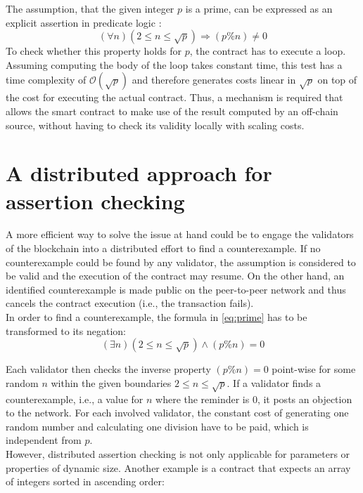 The assumption, that the given integer $p$ is a prime, can be expressed as an explicit assertion in predicate logic \cite{thiemann_2020}: 
\begin{equation}\label{eq:prime}
    (\forall n) (2 \le n \le \sqrt{p}) \Rightarrow (p \% n) \neq 0
\end{equation}
To check whether this property holds for $p$, the contract has to execute a loop. Assuming computing the body of the loop takes constant time, this test has a time complexity of $\mathcal{O}(\sqrt{p})$ and therefore generates costs linear in $\sqrt{p}$ on top of the cost for executing the actual contract. Thus, a mechanism is required that allows the smart contract to make use of the result computed by an off-chain source, without having to check its validity locally with scaling costs.

\section{A distributed approach for assertion checking}
A more efficient way to solve the issue at hand could be to engage the validators of the blockchain into a distributed effort to find a counterexample. If no counterexample could be found by any validator, the assumption is considered to be valid and the execution of the contract may resume. On the other hand, an identified counterexample is made public on the peer-to-peer network and thus cancels the contract execution (i.e., the transaction fails). \\
In order to find a counterexample, the formula in \eqref{eq:prime} has to be transformed to its negation:
\begin{equation}\label{eq:prime_neg}
	(\exists n) (2 \le n \le \sqrt{p}) \wedge (p \% n) = 0
\end{equation}

Each validator then checks the inverse property $(p \% n) = 0$ point-wise for some random $n$ within the given boundaries $2 \le n \le \sqrt{p}$. If a validator finds a counterexample, i.e., a value for $n$ where the reminder is $0$, it posts an objection to the network. For each involved validator, the constant cost of generating one random number and calculating one division have to be paid, which is independent from $p$. \\
However, distributed assertion checking is not only applicable for parameters or properties of dynamic size. Another example is a contract that expects an array of integers sorted in ascending order: 

